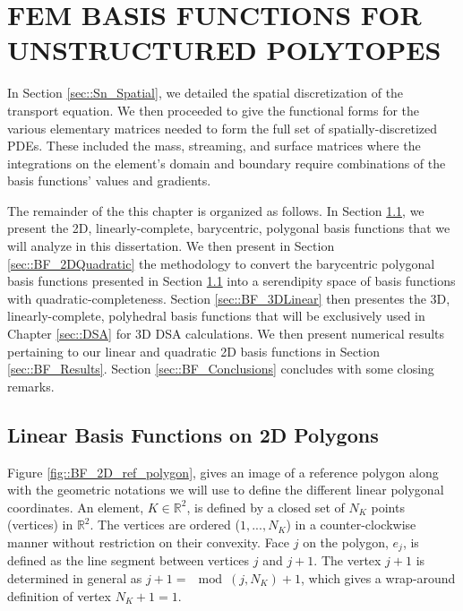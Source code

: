 %
%
%
\chapter{\uppercase {FEM Basis Functions for Unstructured Polytopes}}
\label{sec::BF}

In Section \ref{sec::Sn_Spatial}, we detailed the spatial discretization of the transport equation. We then proceeded to give the functional forms for the various elementary matrices needed to form the full set of spatially-discretized PDEs. These included the mass, streaming, and surface matrices where the integrations on the element's domain and boundary require combinations of the basis functions' values and gradients.

The remainder of the this chapter is organized as follows. In Section \ref{sec::BF_2DLinear}, we present the 2D, linearly-complete, barycentric, polygonal basis functions that we will analyze in this dissertation. We then present in Section \ref{sec::BF_2DQuadratic} the methodology to convert the barycentric polygonal basis functions presented in Section \ref{sec::BF_2DLinear} into a serendipity space of basis functions with quadratic-completeness. Section \ref{sec::BF_3DLinear} then presentes the 3D, linearly-complete, polyhedral basis functions that will be exclusively used in Chapter \ref{sec::DSA} for 3D DSA calculations. We then present numerical results pertaining to our linear and quadratic 2D basis functions in Section \ref{sec::BF_Results}. Section \ref{sec::BF_Conclusions} concludes with some closing remarks.

\section{Linear Basis Functions on 2D Polygons}
\label{sec::BF_2DLinear}

Figure \ref{fig::BF_2D_ref_polygon}, gives an image of a reference polygon along with the geometric notations we will use to define the different linear polygonal coordinates. An element, $K\in \mathbb{R}^2$, is defined by a closed set of $N_K$ points (vertices) in $\mathbb{R}^2$. The vertices are ordered ($1,...,N_K$) in a counter-clockwise manner without restriction on their convexity. Face $j$ on the polygon, $e_j$, is defined as the line segment between vertices $j$ and $j+1$. The vertex $j+1$ is determined in general as $j+1 =\mod(j,N_K)+1$, which gives a wrap-around definition of vertex $N_K+1 = 1$.

